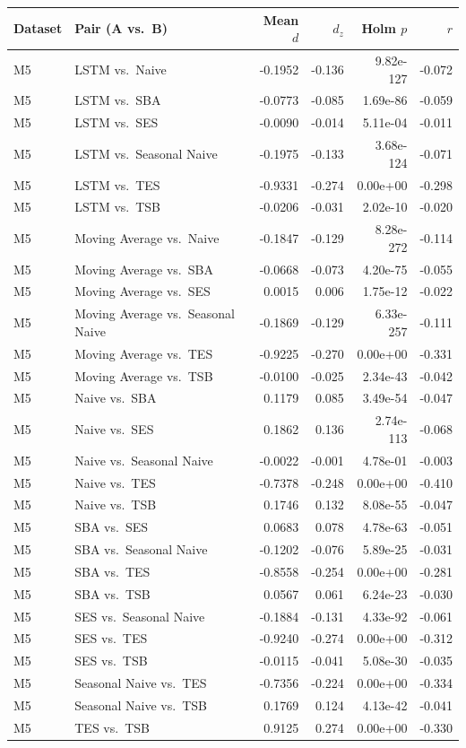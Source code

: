 {\scriptsize
\setlength\tabcolsep{4pt}
\begin{tabular}{llrrrr}
\toprule Dataset & Pair (A vs.~B) & Mean $d$ & $d_z$ & Holm $p$ & $r$ \\
\midrule
M5 & LSTM vs.~Naive & -0.1952 & -0.136 & 9.82e-127 & -0.072 \\
M5 & LSTM vs.~SBA & -0.0773 & -0.085 & 1.69e-86 & -0.059 \\
M5 & LSTM vs.~SES & -0.0090 & -0.014 & 5.11e-04 & -0.011 \\
M5 & LSTM vs.~Seasonal Naive & -0.1975 & -0.133 & 3.68e-124 & -0.071 \\
M5 & LSTM vs.~TES & -0.9331 & -0.274 & 0.00e+00 & -0.298 \\
M5 & LSTM vs.~TSB & -0.0206 & -0.031 & 2.02e-10 & -0.020 \\
M5 & Moving Average vs.~Naive & -0.1847 & -0.129 & 8.28e-272 & -0.114 \\
M5 & Moving Average vs.~SBA & -0.0668 & -0.073 & 4.20e-75 & -0.055 \\
M5 & Moving Average vs.~SES & 0.0015 & 0.006 & 1.75e-12 & -0.022 \\
M5 & Moving Average vs.~Seasonal Naive & -0.1869 & -0.129 & 6.33e-257 & -0.111 \\
M5 & Moving Average vs.~TES & -0.9225 & -0.270 & 0.00e+00 & -0.331 \\
M5 & Moving Average vs.~TSB & -0.0100 & -0.025 & 2.34e-43 & -0.042 \\
M5 & Naive vs.~SBA & 0.1179 & 0.085 & 3.49e-54 & -0.047 \\
M5 & Naive vs.~SES & 0.1862 & 0.136 & 2.74e-113 & -0.068 \\
M5 & Naive vs.~Seasonal Naive & -0.0022 & -0.001 & 4.78e-01 & -0.003 \\
M5 & Naive vs.~TES & -0.7378 & -0.248 & 0.00e+00 & -0.410 \\
M5 & Naive vs.~TSB & 0.1746 & 0.132 & 8.08e-55 & -0.047 \\
M5 & SBA vs.~SES & 0.0683 & 0.078 & 4.78e-63 & -0.051 \\
M5 & SBA vs.~Seasonal Naive & -0.1202 & -0.076 & 5.89e-25 & -0.031 \\
M5 & SBA vs.~TES & -0.8558 & -0.254 & 0.00e+00 & -0.281 \\
M5 & SBA vs.~TSB & 0.0567 & 0.061 & 6.24e-23 & -0.030 \\
M5 & SES vs.~Seasonal Naive & -0.1884 & -0.131 & 4.33e-92 & -0.061 \\
M5 & SES vs.~TES & -0.9240 & -0.274 & 0.00e+00 & -0.312 \\
M5 & SES vs.~TSB & -0.0115 & -0.041 & 5.08e-30 & -0.035 \\
M5 & Seasonal Naive vs.~TES & -0.7356 & -0.224 & 0.00e+00 & -0.334 \\
M5 & Seasonal Naive vs.~TSB & 0.1769 & 0.124 & 4.13e-42 & -0.041 \\
M5 & TES vs.~TSB & 0.9125 & 0.274 & 0.00e+00 & -0.330 \\
\bottomrule
\end{tabular}}

